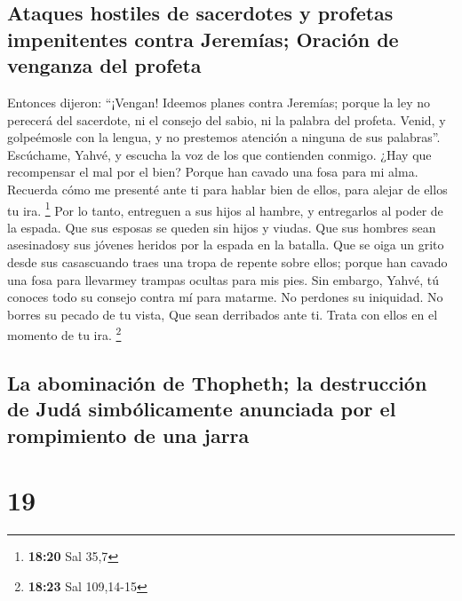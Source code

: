 \hypertarget{ataques-hostiles-de-sacerdotes-y-profetas-impenitentes-contra-jeremuxedas-oraciuxf3n-de-venganza-del-profeta}{%
\subsection{Ataques hostiles de sacerdotes y profetas impenitentes
contra Jeremías; Oración de venganza del
profeta}\label{ataques-hostiles-de-sacerdotes-y-profetas-impenitentes-contra-jeremuxedas-oraciuxf3n-de-venganza-del-profeta}}

 Entonces dijeron: ``¡Vengan! Ideemos planes contra
Jeremías; porque la ley no perecerá del sacerdote, ni el consejo del
sabio, ni la palabra del profeta. Venid, y golpeémosle con la lengua, y
no prestemos atención a ninguna de sus palabras''. 
Escúchame, Yahvé, y escucha la voz de los que contienden conmigo.
 ¿Hay que recompensar el mal por el bien? Porque han
cavado una fosa para mi alma. Recuerda cómo me presenté ante ti para
hablar bien de ellos, para alejar de ellos tu ira. \footnote{\textbf{18:20}
  Sal 35,7}  Por lo tanto, entreguen a sus hijos al
hambre, y entregarlos al poder de la espada. Que sus esposas se queden
sin hijos y viudas. Que sus hombres sean asesinadosy sus jóvenes heridos
por la espada en la batalla.  Que se oiga un grito desde
sus casascuando traes una tropa de repente sobre ellos; porque han
cavado una fosa para llevarmey trampas ocultas para mis pies.
 Sin embargo, Yahvé, tú conoces todo su consejo contra mí
para matarme. No perdones su iniquidad. No borres su pecado de tu vista,
Que sean derribados ante ti. Trata con ellos en el momento de tu ira.
\footnote{\textbf{18:23} Sal 109,14-15}

\hypertarget{la-abominaciuxf3n-de-thopheth-la-destrucciuxf3n-de-juduxe1-simbuxf3licamente-anunciada-por-el-rompimiento-de-una-jarra}{%
\subsection{La abominación de Thopheth; la destrucción de Judá
simbólicamente anunciada por el rompimiento de una
jarra}\label{la-abominaciuxf3n-de-thopheth-la-destrucciuxf3n-de-juduxe1-simbuxf3licamente-anunciada-por-el-rompimiento-de-una-jarra}}

\hypertarget{section-18}{%
\section{19}\label{section-18}}


